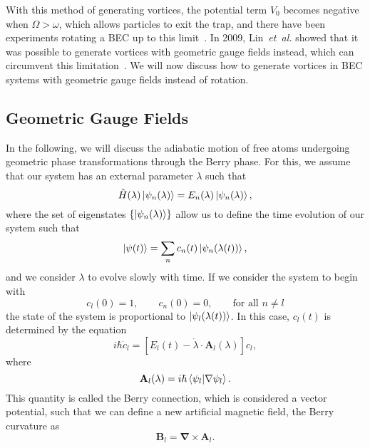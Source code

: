 With this method of generating vortices, the potential term $V_0$ becomes negative when $\Omega > \omega$, which allows particles to exit the trap, and there have been experiments rotating a BEC up to this limit~\cite{Schweikhard2004}.
In 2009, Lin~\textit{et~al.} showed that it was possible to generate vortices with geometric gauge fields instead, which can circumvent this limitation~\cite{Lin2009}.
We will now discuss how to generate vortices in BEC systems with geometric gauge fields instead of rotation.

\subsection{Geometric Gauge Fields}
\label{sec:geom}

In the following, we will discuss the adiabatic motion of free atoms undergoing geometric phase transformations through the Berry phase. 
For this, we assume that our system has an external parameter $\lambda$ such that
\begin{equation}
\hat H(\lambda) \ket{\psi_n(\lambda)} = E_n(\lambda)\ket{\psi_n(\lambda)},
\end{equation}
where the set of eigenstates $\left\{ \ket{\psi_n(\lambda)} \right\}$ allow us to define the time evolution of our system such that
\begin{equation}
\ket{\psi(t)} = \sum_n c_n(t) \ket{\psi_n(\lambda(t))},
\end{equation}
and we consider $\lambda$ to evolve slowly with time. If we consider the system to begin with
\begin{equation}
c_l(0) = 1,
\qquad
c_n(0) = 0, 
\qquad
\text{for all } n\neq l
\end{equation}
the state of the system is proportional to $\ket{\psi_l(\lambda(t))}$.
In this case, $c_l(t)$ is determined by the equation
\begin{equation}
i \hbar \dot{c}_l =  [E_l(t) - \dot{\lambda} \cdot \mathbf{A}_l(\lambda)]c_l,
\label{Bcnx-1}
\end{equation}
where 
\begin{equation}
\mathbf{A}_l(\lambda) = i \hbar \braket{\psi_l|\nabla\psi_l}.
\label{eqn:Bcnx}
\end{equation}
This quantity is called the Berry connection, which is considered a vector potential, such that we can define a new artificial magnetic field, the Berry curvature as
\begin{equation}
\mathbf{B}_l = \mathbf{\nabla} \times \mathbf{A}_l.
\label{eqn:BC}
\end{equation}

